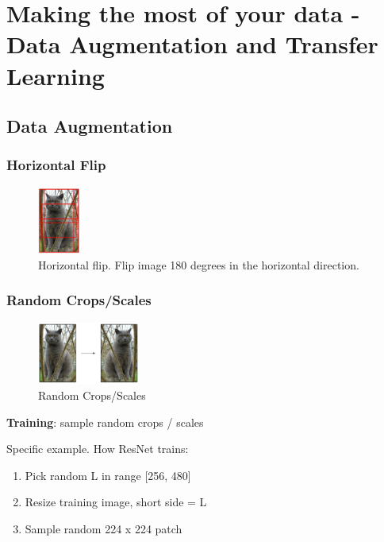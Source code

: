 \chapter{Making the most of your data - Data Augmentation and Transfer Learning}

\section{Data Augmentation}

\subsection*{Horizontal Flip} 
\begin{figure}[!htb]
  \centering
  \includegraphics[width=0.125\textwidth]{Images/data_aug_trans/1.png}
  \caption{Horizontal flip. Flip image 180 degrees in the horizontal direction.}
\end{figure}


\subsection*{Random Crops/Scales}
\begin{figure}[!htb]
  \centering
  \includegraphics[width=0.3\textwidth]{Images/data_aug_trans/2.png}
  \caption{Random Crops/Scales}
\end{figure}

\textbf{Training}: sample random crops / scales

Specific example. How ResNet trains:
\begin{enumerate}
\item Pick random L in range [256, 480]
\item Resize training image, short side = L
\item Sample random 224 x 224 patch
\end{enumerate}

